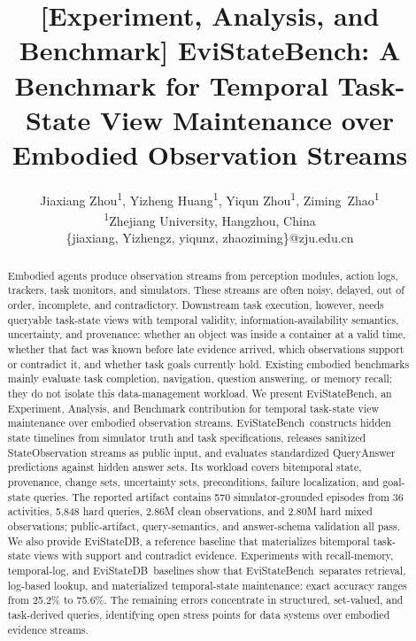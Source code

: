 \documentclass[conference]{IEEEtran}
\newcommand{\bench}{EviStateBench}
\newcommand{\engine}{EviStateDB}
\begin{document}
\title{[Experiment, Analysis, and Benchmark] EviStateBench: A Benchmark for Temporal Task-State View Maintenance over Embodied Observation Streams}

\author{Jiaxiang Zhou\textsuperscript{1},
Yizheng Huang\textsuperscript{1},
Yiqun Zhou\textsuperscript{1},
Ziming~Zhao\textsuperscript{1}\\
\textsuperscript{1}Zhejiang University, Hangzhou, China\\
\{jiaxiang, Yizhengz, yiqunz, zhaoziming\}@zju.edu.cn
}



\maketitle

\begin{abstract}
Embodied agents produce observation streams from perception modules, action logs, trackers, task monitors, and simulators. These streams are often noisy, delayed, out of order, incomplete, and contradictory. Downstream task execution, however, needs queryable task-state views with temporal validity, information-availability semantics, uncertainty, and provenance: whether an object was inside a container at a valid time, whether that fact was known before late evidence arrived, which observations support or contradict it, and whether task goals currently hold. Existing embodied benchmarks mainly evaluate task completion, navigation, question answering, or memory recall; they do not isolate this data-management workload. We present \bench, an Experiment, Analysis, and Benchmark contribution for temporal task-state view maintenance over embodied observation streams. \bench\ constructs hidden state timelines from simulator truth and task specifications, releases sanitized StateObservation streams as public input, and evaluates standardized QueryAnswer predictions against hidden answer sets. Its workload covers bitemporal state, provenance, change sets, uncertainty sets, preconditions, failure localization, and goal-state queries. The reported artifact contains 570 simulator-grounded episodes from 36 activities, 5,848 hard queries, 2.86M clean observations, and 2.80M hard mixed observations; public-artifact, query-semantics, and answer-schema validation all pass. We also provide \engine, a reference baseline that materializes bitemporal task-state views with support and contradict evidence. Experiments with recall-memory, temporal-log, and \engine\ baselines show that \bench\ separates retrieval, log-based lookup, and materialized temporal-state maintenance: exact accuracy ranges from 25.2\% to 75.6\%. The remaining errors concentrate in structured, set-valued, and task-derived queries, identifying open stress points for data systems over embodied evidence streams.
\end{abstract}
\end{document}
